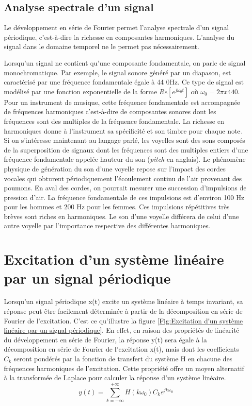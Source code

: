 	
	\subsection{Analyse spectrale d'un signal}
	
	Le développement en série de Fourier permet l'analyse spectrale d'un signal périodique, c'est-à-dire la richesse en composantes harmoniques. L'analyse du signal dans le domaine temporel ne le permet pas nécessairement.
	
	Lorsqu'un signal ne contient qu'une composante fondamentale, on parle de signal monochromatique. Par exemple, le signal sonore généré par un diapason, est caractérisé par une fréquence fondamentale égale à 44 0Hz. Ce type de signal est modélisé par une
	fonction exponentielle de la forme $Re[e^{j\omega_{0}t}]$ où $\omega_{0}=2\pi x440$. Pour un instrument de musique, cette fréquence fondamentale est accompagnée de fréquences 	harmoniques c'est-à-dire de composantes sonores dont les fréquences sont des multiples de la fréquence fondamentale. La richesse en harmoniques donne à l'instrument sa spécificité et son timbre pour chaque note. Si on s'intéresse maintenant au langage parlé, les voyelles sont des sons composés de la superposition de signaux dont les fréquences sont des multiples entiers 	d'une fréquence fondamentale appelée hauteur du son (\textit{pitch} en anglais). Le phénomène physique
	de génération du son d'une voyelle repose sur l'impact des cordes vocales qui obturent
	périodiquement l'écoulement continu de l'air provenant des poumons. En aval des cordes, on pourrait mesurer une succession d'impulsions de pression d'air. La fréquence fondamentale de	ces impulsions est d'environ 100 Hz pour les hommes et 200 Hz pour les femmes. Ces impulsions répétitives très brèves sont riches en harmoniques. Le son d'une voyelle différera de celui d'une autre voyelle par l'importance respective des différentes harmoniques.\\



	
	\section{Excitation d'un système linéaire par un signal périodique}
	Lorsqu'un signal périodique x(t) excite un système linéaire à temps invariant, sa réponse peut être facilement déterminée à partir de la décomposition en série de Fourier de l'excitation. C'est ce qu'illustre la figure \ref{Fig:Excitation d'un système linéaire par un signal périodique}. En effet, en raison des propriétés de linéarité du développement en série de Fourier, la réponse y(t) sera égale à la décomposition en série de Fourier de l'excitation x(t), mais dont les coefficients $C_k$ seront pondérés par la fonction de transfert du système H en chacune des fréquences harmoniques de l'excitation. Cette propriété offre un moyen alternatif à la transformée de Laplace pour calculer la réponse d'un système linéaire.
	\begin{equation}\label{key}
	y(t)=\sum_{k=-\infty}^{+\infty}H(k\omega_{0})C_ke^{jk\omega_{0}}
	\end{equation}
	 
